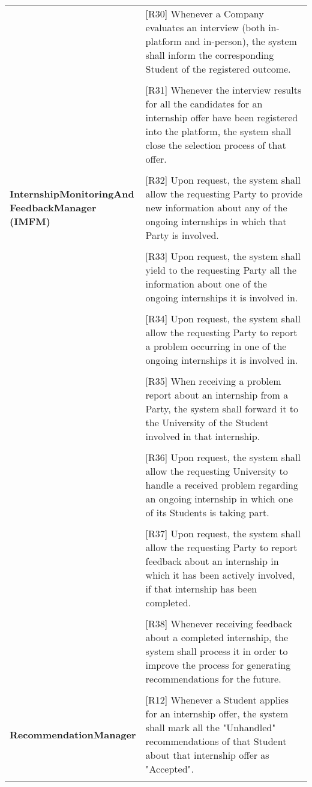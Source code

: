 \begin{center}
\begin{longtable}{p{0.3\linewidth}p{0.7\linewidth}}
        & [R30] Whenever a Company evaluates an interview (both in-platform and in-person), the system shall inform the corresponding Student of the registered outcome. \\ \\
        & [R31] Whenever the interview results for all the candidates for an internship offer have been registered into the platform, the system shall close the selection process of that offer. \\ \\
        \hline
        \textbf{InternshipMonitoringAnd FeedbackManager (IMFM)}              & [R32] Upon request, the system shall allow the requesting Party to provide new information about any of the ongoing internships in which that Party is involved. \\ \\
        & [R33] Upon request, the system shall yield to the requesting Party all the information about one of the ongoing internships it is involved in. \\ \\
        & [R34] Upon request, the system shall allow the requesting Party to report a problem occurring in one of the ongoing internships it is involved in. \\ \\ 
        & [R35] When receiving a problem report about an internship from a Party, the system shall forward it to the University of the Student involved in that internship. \\ \\
        & [R36] Upon request, the system shall allow the requesting University to handle a received problem regarding an ongoing internship in which one of its Students is taking part. \\ \\
        & [R37] Upon request, the system shall allow the requesting Party to report feedback about an internship in which it has been actively involved, if that internship has been completed. \\ \\
        & [R38] Whenever receiving feedback about a completed internship, the system shall process it in order to improve the process for generating recommendations for the future. \\ \\
        \hline
        \textbf{RecommendationManager}        & [R12] Whenever a Student applies for an internship offer, the system shall mark all the "Unhandled" recommendations of that Student about that internship offer as "Accepted". \\ \\

\end{longtable}
\end{center}
